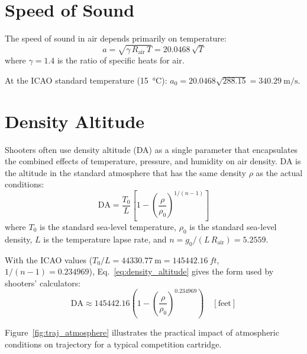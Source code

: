 \documentclass[11pt,twoside,openright]{report}
\begin{document}
\section{Speed of Sound}

The speed of sound in air depends primarily on temperature:
\begin{equation}
  a = \sqrt{\gamma \, R_{\mathrm{air}} \, T} = 20.0468\,\sqrt{T}
  \label{eq:speed_of_sound}
\end{equation}
where $\gamma = 1.4$ is the ratio of specific heats for air.

At the ICAO standard temperature (\SI{15}{\celsius}): $a_0 = 20.0468\sqrt{288.15} = \SI{340.29}{\meter\per\second}$.

\section{Density Altitude}

Shooters often use density altitude (DA) as a single parameter that encapsulates the combined effects of temperature, pressure, and humidity on air density. DA is the altitude in the standard atmosphere that has the same density $\rho$ as the actual conditions:
\begin{equation}
  \text{DA} = \frac{T_0}{L}\left[1 - \left(\frac{\rho}{\rho_0}\right)^{1/(n-1)}\right]
  \label{eq:density_altitude}
\end{equation}
where $T_0$ is the standard sea-level temperature, $\rho_0$ is the standard sea-level density, $L$ is the temperature lapse rate, and $n = g_0/(L\,R_{\mathrm{air}}) = 5.2559$.

With the ICAO values ($T_0/L = \SI{44330.77}{\meter} = \SI{145442.16}{ft}$, $1/(n-1) = 0.234969$), Eq.~\eqref{eq:density_altitude} gives the form used by shooters' calculators:
\begin{equation}
  \text{DA} \approx 145442.16 \left(1 - \left(\frac{\rho}{\rho_0}\right)^{0.234969}\right) \quad [\text{feet}]
  \label{eq:density_altitude_ft}
\end{equation}

Figure~\ref{fig:traj_atmosphere} illustrates the practical impact of atmospheric conditions on trajectory for a typical competition cartridge.
\end{document}
